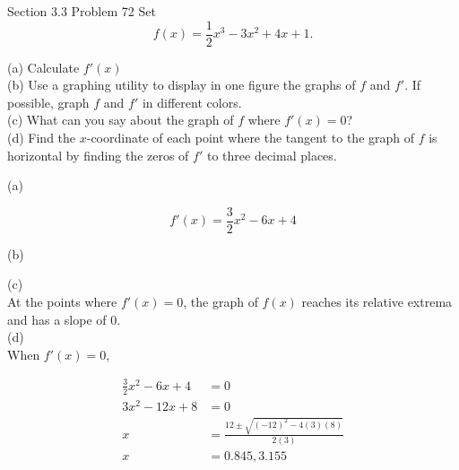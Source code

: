 \documentclass{article}
\begin{document}
    \begin{tbhtheorem}{Section 3.3 Problem 72}
        Set
        \[
            f(x) = \frac{1}{2}x^3 - 3x^2 + 4x + 1.
        \]

        (a) Calculate $f'(x)$ \\
        (b) Use a graphing utility to display in one figure the graphs of $f$ and $f'$. If possible, graph $f$ and $f'$ in different colors. \\
        (c) What can you say about the graph of $f$ where $f'(x)=0$? \\
        (d) Find the $x$-coordinate of each point where the tangent to the graph of $f$ is horizontal by finding the zeros of $f'$ to three decimal places.
    \end{tbhtheorem}

    (a)

    \[
        f'(x) = \frac{3}{2}x^2 - 6x + 4
    \]

    (b)

    \begin{center}
    \end{center}

    (c) \\
    At the points where $f'(x)=0$, the graph of $f(x)$ reaches its relative extrema and has a slope of 0. \\

    (d) \\
    When $f'(x)=0$,

    \begin{align*}
        \frac{3}{2}x^2 - 6x + 4 &= 0 \\
        3x^2 - 12x + 8          &= 0 \\
        x                       &= \frac{12\pm \sqrt{(-12)^2 - 4(3)(8)}}{2(3)} \\
        x                       &= 0.845, 3.155
    \end{align*}
\end{document}

